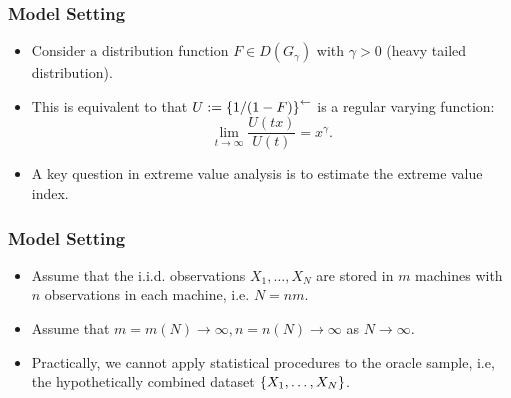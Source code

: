 \documentclass{beamer}
\begin{document}

    



\begin{frame}
    \frametitle{Model Setting}
\begin{itemize}
    \item Consider a distribution function $F\in D(G_{\gamma})$ with $\gamma>0$ (heavy tailed distribution).
    \bigskip
    \item This is equivalent to that $U:=\left\{1/(1-F)\right\}^{\leftarrow}$ is a regular varying function:
    $$
        \lim_{t\to\infty} \frac{U(tx)}{U(t)} = x^{\gamma}.
    $$
    \bigskip
    \item A key question in extreme value analysis is to estimate the extreme value index.
\end{itemize}
    

\end{frame}


\begin{frame}
    \frametitle{Model Setting}
\begin{itemize}
    \item Assume that the i.i.d. observations $X_1,\dots,X_N$ are stored in $m$ machines with $n$ observations in each machine, i.e. $N = nm$.
    \bigskip
    \item Assume that $m = m(N)\to\infty, n= n(N)\to \infty$ as $N\to\infty$.
    \bigskip
    \item Practically, we cannot apply statistical procedures to the oracle
    sample, i.e, the hypothetically combined dataset $\left\{X_1,\dots,X_N\right\}$.
\end{itemize}
    

\end{frame}
\end{document}
